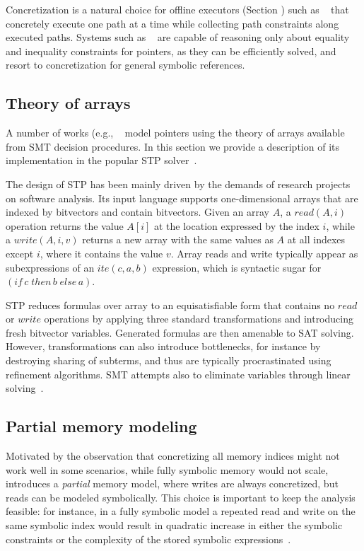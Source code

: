 Concretization is a natural choice for offline executors (Section \missing) such as ~\cite{DART-PLDI05,SAGE-NDSS08} that concretely execute one path at a time while collecting path constraints along executed paths. Systems such as ~\cite{CREST-ASE08,CUTE-FSE13} are capable of reasoning only about equality and inequality constraints for pointers, as they can be efficiently solved, and resort to concretization for general symbolic references.



\subsection{Theory of arrays}
A number of works (e.g., ~\cite{EXE-CCS06,KLEE-OSDI08,SAGE-NDSS08} model pointers using the theory of arrays available from SMT decision procedures. In this section we provide a description of its implementation in the popular STP solver~\cite{STP-CAV07}.

The design of STP has been mainly driven by the demands of research projects on software analysis. Its input language supports one-dimensional arrays that are indexed by bitvectors and contain bitvectors. Given an array $A$, a $read(A,i)$ operation returns the value $A[i]$ at the location expressed by the index $i$, while a $write(A,i,v)$ returns a new array with the same values as $A$ at all indexes except $i$, where it contains the value $v$. Array reads and write typically appear as subexpressions of an $ite(c,a,b)$ expression, which is syntactic sugar for $(if\,c\;then\,b\;else\,a)$.

STP reduces formulas over array to an equisatisfiable form that contains no $read$ or $write$ operations by applying three standard transformations and introducing fresh bitvector variables. Generated formulas are then amenable to SAT solving. However, transformations can also introduce bottlenecks, for instance by destroying sharing of subterms, and thus are typically procrastinated using refinement algorithms. SMT attempts also to eliminate variables through linear solving~\cite{STP-CAV07}.

\subsection{Partial memory modeling}
\label{ss:index-based-memory}
Motivated by the observation that concretizing all memory indices might not work well in some scenarios, while fully symbolic memory would not scale, ~\cite{MAYHEM-SP12} introduces a {\em partial} memory model, where writes are always concretized, but reads can be modeled symbolically. This choice is important to keep the analysis feasible: for instance, in a fully symbolic model a repeated read and write on the same symbolic index would result in quadratic increase in either the symbolic constraints or the complexity of the stored symbolic expressions~\cite{DRILLER-NDSS16}.

